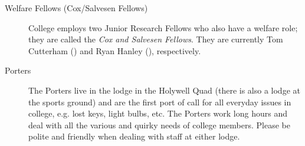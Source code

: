 \begin{description}
\item[Welfare Fellows (Cox/Salvesen Fellows)]
College employs two Junior Research Fellows who also have a welfare role; they
are called the \emph{Cox and Salvesen Fellows}. They are currently Tom Cutterham (\href{mailto:tom.cutterham@new.ox.ac.uk}{}) and Ryan Hanley (\href{mailto:ryan.hanley@new.ox.ac.uk}{}), respectively.


\item[Porters]
The Porters live in the lodge in the Holywell Quad (there is also a lodge at the sports ground) and are the first port of call for all everyday issues in college, e.g. lost keys, light bulbs, etc. The Porters work long hours and deal with all the various and quirky needs of college members. Please be polite and friendly when dealing with staff at either lodge.
\end{description}